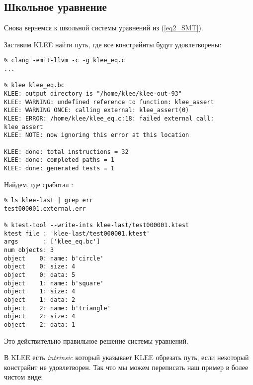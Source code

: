 \subsection{Школьное уравнение}

Снова вернемся к школьной системы уравнений из (\ref{eq2_SMT}).

Заставим KLEE найти путь, где все констрайнты будут удовлетворены:



\begin{lstlisting}
% clang -emit-llvm -c -g klee_eq.c
...

% klee klee_eq.bc
KLEE: output directory is "/home/klee/klee-out-93"
KLEE: WARNING: undefined reference to function: klee_assert
KLEE: WARNING ONCE: calling external: klee_assert(0)
KLEE: ERROR: /home/klee/klee_eq.c:18: failed external call: klee_assert
KLEE: NOTE: now ignoring this error at this location

KLEE: done: total instructions = 32
KLEE: done: completed paths = 1
KLEE: done: generated tests = 1
\end{lstlisting}

Найдем, где сработал :

\begin{lstlisting}
% ls klee-last | grep err
test000001.external.err

% ktest-tool --write-ints klee-last/test000001.ktest
ktest file : 'klee-last/test000001.ktest'
args       : ['klee_eq.bc']
num objects: 3
object    0: name: b'circle'
object    0: size: 4
object    0: data: 5
object    1: name: b'square'
object    1: size: 4
object    1: data: 2
object    2: name: b'triangle'
object    2: size: 4
object    2: data: 1
\end{lstlisting}

Это действительно правильное решение системы уравнений.

В KLEE есть \textit{intrinsic}  который указывает KLEE обрезать путь, если некоторый констрайнт не удовлетворен.
Так что мы можем переписать наш пример в более чистом виде:




